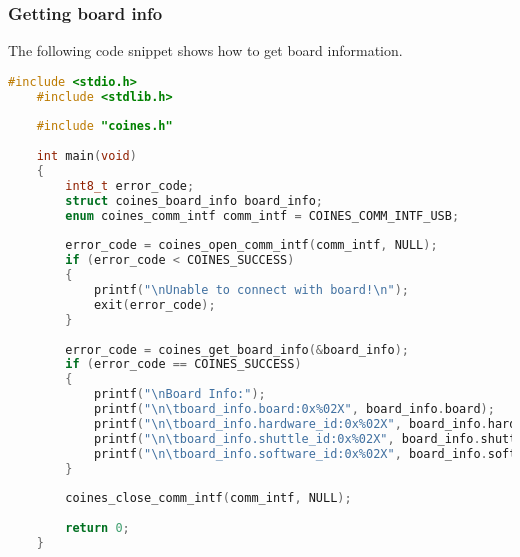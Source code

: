 \documentclass{article}
\begin{document}
\subsubsection{Getting board info}
The following code snippet shows how to get board information.
\begin{lstlisting}[language=c]
	#include <stdio.h>
	#include <stdlib.h>
	
	#include "coines.h"
	
	int main(void)
	{
		int8_t error_code;
		struct coines_board_info board_info;
		enum coines_comm_intf comm_intf = COINES_COMM_INTF_USB;
	
		error_code = coines_open_comm_intf(comm_intf, NULL);
		if (error_code < COINES_SUCCESS)
		{
			printf("\nUnable to connect with board!\n");
			exit(error_code);
		}
	
		error_code = coines_get_board_info(&board_info);
		if (error_code == COINES_SUCCESS)
		{
			printf("\nBoard Info:");
			printf("\n\tboard_info.board:0x%02X", board_info.board);
			printf("\n\tboard_info.hardware_id:0x%02X", board_info.hardware_id);
			printf("\n\tboard_info.shuttle_id:0x%02X", board_info.shuttle_id);
			printf("\n\tboard_info.software_id:0x%02X", board_info.software_id);
		}
	
		coines_close_comm_intf(comm_intf, NULL);
	
		return 0;
	}
	
\end{lstlisting}
\end{document}

